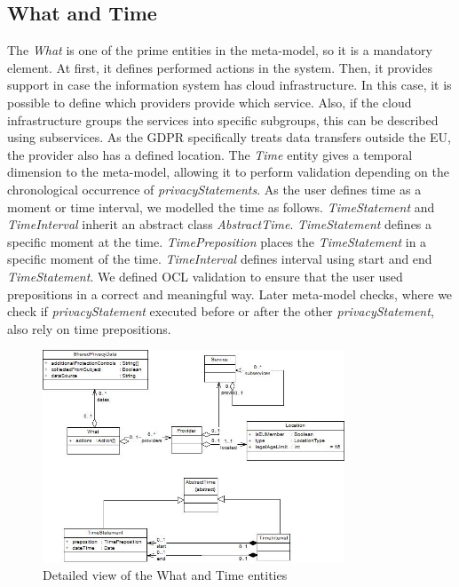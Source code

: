 \documentclass[11pt,english]{article}
\begin{document}
\subsection{What and Time}
The \emph{What} is one of the prime entities in the meta-model, so it is a mandatory element. At first, it defines performed actions in the system. Then, it provides support in case the information system has cloud infrastructure. In this case, it is possible to define which providers provide which service. Also, if the cloud infrastructure groups the services into specific subgroups, this can be described using subservices. As the GDPR specifically treats data transfers outside the EU, the provider also has a defined location. \newline The \emph{Time} entity gives a temporal dimension to the meta-model, allowing it to perform validation depending on the chronological occurrence of \emph{privacyStatements}. As the user defines time as a moment or time interval, we modelled the time as follows. \emph{TimeStatement} and \emph{TimeInterval} inherit an abstract class \emph{AbstractTime}. \emph{TimeStatement} defines a specific moment at the time. \emph{TimePreposition} places the \emph{TimeStatement} in a specific moment of the time. \emph{TimeInterval} defines interval using start and end \emph{TimeStatement}. We defined OCL validation to ensure that the user used prepositions in a correct and meaningful way. Later meta-model checks, where we check if \emph{privacyStatement} executed before or after the other \emph{privacyStatement}, also rely on time prepositions.
\begin{figure}[H]
    \centering
    \includegraphics[width=9cm,scale=0.5]{images/whatAndTime.jpg}
    \caption{Detailed view of the What and Time entities}
    \label{fig:WhatAndTime}
\end{figure}
\end{document}
